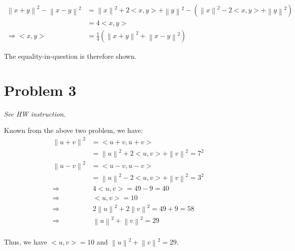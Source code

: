 \documentclass[11pt]{article}
\providecommand{\norm}[1]{\left\lVert #1 \right\rVert}
\begin{document}
\begin{align*}
    \norm{x + y}^2 - \norm{x - y}^2 &= \norm{x}^2 + 2<x, y> + \norm{y}^2  - (\norm{x}^2 - 2<x, y> + \norm{y}^2) \\
    &= 4<x, y> \\
    \Longrightarrow <x, y> &= \frac{1}{4}(\norm{x + y}^2 + \norm{x - y}^2)
\end{align*}

The equality-in-question is therefore shown.

\section*{Problem 3}
\textit{See HW instruction.}\newline

Known from the above two problem, we have:
\begin{align*}
    \norm{u + v}^2 &= <u + v, u + v> \\
    &= \norm{u}^2 + 2<u, v> + \norm{v}^2 = 7^2 \\
    \norm{u - v}^2 &= <u - v, u - v> \\
    &= \norm{u}^2 - 2<u, v> + \norm{v}^2 = 3^2 \\
    \Rightarrow& \ 4<u, v> = 49 - 9 = 40 \\
    \Longrightarrow& \ <u, v> = 10 \\
    \Rightarrow& \ 2\norm{u}^2 + 2\norm{v}^2 = 49 + 9 = 58 \\
    \Longrightarrow& \ \norm{u}^2 + \norm{v}^2 = 29 \\
\end{align*}

Thus, we have $<u, v> = 10$ and $\norm{u}^2 + \norm{v}^2 = 29$.
\end{document}
